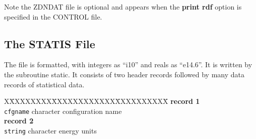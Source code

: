 Note the ZDNDAT file is optional and appears when the {\bf print rdf}
option is specified in the CONTROL file.

\subsection{The STATIS File}
\label{statisfile}

The file is formatted, with integers as ``i10'' and reals as
``e14.6''.  It is written by the subroutine {\sc static}. It consists
of two header records followed by many data records of statistical
data.
\begin{tabbing}
X\=XXXXXXXX\=XXXXXXXXXXXX\=XXXXXXXXXX\=\kill
{\bf record 1}\\
\> {\tt cfgname} \> character \> configuration name\\
{\bf record 2}\\
\> {\tt string} \> character \> energy units\\
\end{tabbing}

